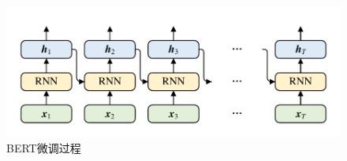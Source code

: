 \begin{figure}[htb]
	\centering
	\includegraphics[page=13, width=0.75\linewidth]{images/structure.pdf}
	\caption{BERT微调过程}
	\label{fig:BERTFineTunning}
\end{figure}